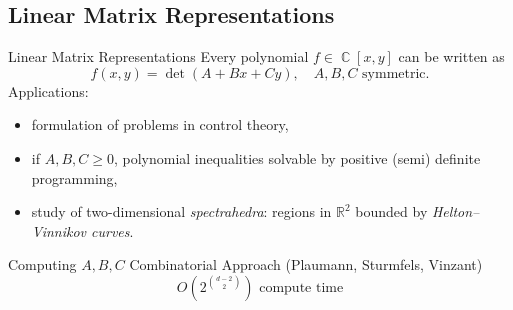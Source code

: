 \documentclass{beamer}
\DeclareMathOperator{\CC}{\mathbb{C}}
\newcommand{\thetachar}[2] {\theta {\scriptsize \begin{bmatrix}#1\\#2\end{bmatrix}}}
\begin{document}
\subsection{Linear Matrix Representations}



\begin{frame}{Linear Matrix Representations}{}
  Every polynomial $f \in \CC[x,y]$ can be written as
  \[
      f(x,y) = \det(A + Bx + Cy), \quad A,B,C \text{ symmetric}.
  \]
  Applications:
  \begin{itemize}
    \item formulation of problems in control theory,
    \item if $A,B,C \geq 0$, polynomial inequalities solvable by
      positive (semi) definite programming,
    \item study of two-dimensional {\it spectrahedra}: regions in
      $\mathbb{R}^2$ bounded by {\it Helton--Vinnikov curves}.
  \end{itemize}
\end{frame}



\begin{frame}{Computing $A,B,C$}{}
  Combinatorial Approach (Plaumann, Sturmfels, Vinzant)
  \[
      O \left( 2^{d-2 \choose 2} \right)
      \text{ compute time}
  \]

\end{frame}


\end{document}
